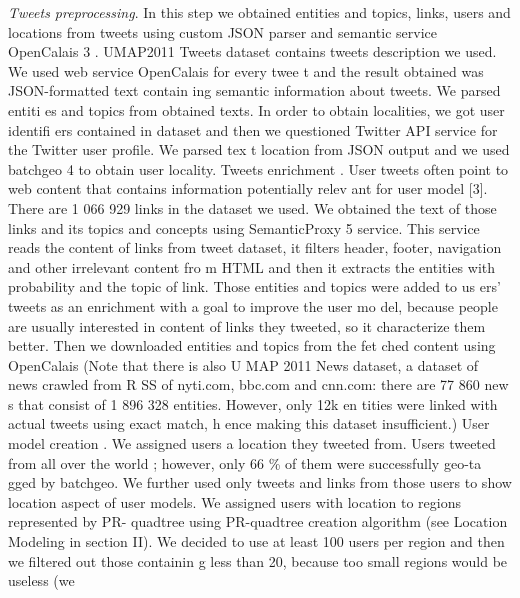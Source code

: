 \documentclass[conference]{IEEEtran}
\begin{document}
\textit{Tweets preprocessing}.  In  this  step  we  obtained  entities 
and  topics,  links,  users  and  locations  from  tweets 
using 
custom  JSON  parser  and  semantic  service  OpenCalais
3
. 
UMAP2011  Tweets  dataset  contains  tweets  description
  we 
used.  We  used  web  service  OpenCalais  for  every  twee
t  and 
the   result   obtained   was   JSON-formatted   text   contain
ing 
semantic  information  about  tweets.  We  parsed  entiti
es  and 
topics from obtained texts.  
In  order  to  obtain  localities,  we  got  user  identifi
ers 
contained  in  dataset  and  then  we  questioned  Twitter
  API 
service  for  the  Twitter  user  profile.  We  parsed  tex
t  location 
from  JSON  output  and  we  used  batchgeo
4
 to  obtain  user 
locality.  
Tweets   enrichment
.   User   tweets   often   point   to   web 
content that contains information potentially relev
ant for user 
model [3]. There are 1 066 929 links in the dataset
 we used. 
We  obtained  the  text  of  those  links  and  its  topics 
and 
concepts  using  SemanticProxy
5
 service.  This  service  reads 
the  content  of  links  from  tweet  dataset,  it  filters
  header, 
footer,  navigation  and  other  irrelevant  content  fro
m  HTML 
and then it extracts the entities with probability 
and the topic 
of link. Those entities and topics were added to us
ers’ tweets 
as  an  enrichment  with  a  goal  to  improve  the  user  mo
del, 
because people are usually interested in content of
 links they 
tweeted, so it characterize them better. 
Then we downloaded entities and topics from the fet
ched 
content  using  OpenCalais  (Note  that  there  is  also  U
MAP 
2011  News  dataset,  a  dataset  of  news  crawled  from  R
SS  of 
nyti.com,  bbc.com  and  cnn.com:  there  are  77 860  new
s  that 
consist  of  1 896 328  entities.  However,  only  12k  en
tities 
were  linked  with  actual  tweets  using  exact  match,  h
ence 
making this dataset insufficient.) 
User  model  creation
.  We  assigned  users  a  location  they 
tweeted   from.   Users   tweeted   from   all   over   the   world
; 
however,  only  66 \%  of  them  were  successfully  geo-ta
gged 
by  batchgeo.  We  further  used  only  tweets  and  links 
from 
those  users  to  show  location  aspect  of  user  models.
  We 
assigned  users  with  location  to  regions  represented
  by  PR-
quadtree using PR-quadtree creation algorithm (see 
Location 
Modeling in section II). We decided to use at least
 100 users 
per region and then we filtered out those containin
g less than 
20,  because  too  small  regions  would  be  useless  (we 
\end{document}
